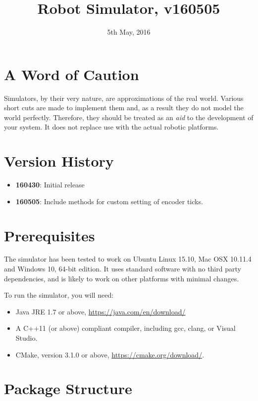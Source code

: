 \documentclass[a4paper]{article}
\begin{document}
\title{\Huge\bfseries Robot Simulator, v160505}
\date{5th May, 2016}

\maketitle

\section*{A Word of Caution}

Simulators, by their very nature, are approximations of the real world. Various short cuts are made to implement them and, as a result they do not model the world perfectly. Therefore, they should be treated as an {\itshape aid\/} to the development of your system. It does not replace use with the actual robotic platforms.

\section*{Version History}

\begin{itemize}
\item {\bfseries 160430}: Initial release
\item {\bfseries 160505}: Include methods for custom setting of encoder ticks.
\end{itemize}

\section*{Prerequisites}

The simulator has been tested to work on Ubuntu Linux 15.10, Mac OSX 10.11.4 and Windows 10, 64-bit edition. It uses standard software with no third party dependencies, and is likely to work on other platforms with minimal changes.

To run the simulator, you will need:

\begin{itemize}
\item Java JRE 1.7 or above, \url{https://java.com/en/download/}
\item A C++11 (or above) compliant compiler, including gcc, clang, or Visual Studio.
\item CMake, version 3.1.0 or above, \url{https://cmake.org/download/}.
\end{itemize}

\section*{Package Structure}
\end{document}
